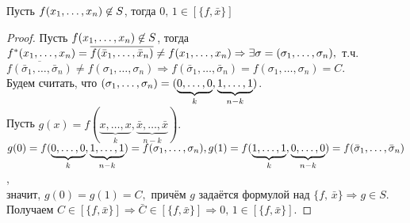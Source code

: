 \begin{lemma}  Пусть $f(x_1, \ldots, x_n)\not\in S$, тогда $0,\,1 \in [\{f, \bar{x}\}]$
\end{lemma}
\begin{proof} 
    Пусть $f(x_1, \ldots, x_n)\not\in S$, тогда  $f^*(x_1, \ldots, x_n) = \overline{f(\bar{x}_1,\ldots,\bar{x}_n)} \neq f(x_1, \ldots, x_n) \Rightarrow \exists \sigma = (\sigma_1,\ldots,\sigma_n),$ т.ч. $\overline{f(\bar{\sigma}_1,\ldots,\bar{\sigma}_n)} \neq f(\sigma_1,\ldots,\sigma_n) \Rightarrow f(\bar{\sigma}_1,\ldots,\bar{\sigma}_n) = f(\sigma_1,\ldots,\sigma_n) = C.$\\
    Будем считать, что $(\sigma_1, \ldots, \sigma_n) = (\underbrace{0,\ldots,0}_k,\underbrace{1,\ldots,1}_{n-k})$.\\
    Пусть $g(x) = f(\underbrace{x,\ldots,x}_k,\underbrace{ \bar{x},\ldots,\bar{x}}_{n-k}).$\\
    $g(0) = f(\underbrace{0,\ldots,0}_k,\underbrace{ 1,\ldots,1}_{n-k}) = f(\sigma_1, \ldots, \sigma_n),\\
    g(1)= f(\underbrace{1,\ldots,1}_k,\underbrace{ 0,\ldots,0}_{n-k}) = f(\bar{\sigma}_1,\ldots,\bar{\sigma}_n)$,\\ значит, 
    $g(0) = g(1) = C, $ причём $g$ задаётся формулой над $\{f,\,\bar{x}\} \Rightarrow g \in S$.\\
    Получаем $C \in  [\{f, \bar{x}\}] \Rightarrow \bar{C} \in [\{f, \bar{x}\}] \Rightarrow 0,\,1 \in [\{f, \bar{x}\}].$
\end{proof}

